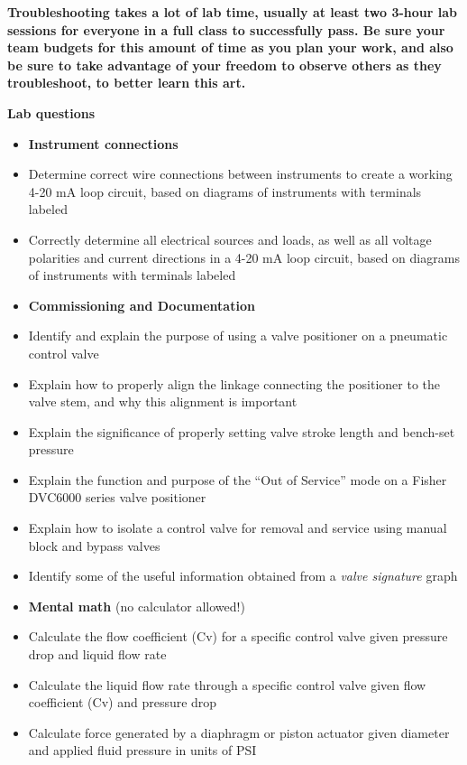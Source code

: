 \begin{itemize}
\vskip 10pt

{\bf Troubleshooting takes a lot of lab time, usually at least two 3-hour lab sessions for everyone in a full class to successfully pass.  Be sure your team budgets for this amount of time as you plan your work, and also be sure to take advantage of your freedom to observe others as they troubleshoot, to better learn this art.}



\vfil \eject

\noindent
{\bf Lab questions}

\vskip 5pt

\begin{itemize}
\item{} {\bf Instrument connections}
\item{} Determine correct wire connections between instruments to create a working 4-20 mA loop circuit, based on diagrams of instruments with terminals labeled
\item{} Correctly determine all electrical sources and loads, as well as all voltage polarities and current directions in a 4-20 mA loop circuit, based on diagrams of instruments with terminals labeled
\end{itemize}

\filbreak

\begin{itemize}
\item{} {\bf Commissioning and Documentation}
\item{} Identify and explain the purpose of using a valve positioner on a pneumatic control valve
\item{} Explain how to properly align the linkage connecting the positioner to the valve stem, and why this alignment is important
\item{} Explain the significance of properly setting valve stroke length and bench-set pressure
\item{} Explain the function and purpose of the ``Out of Service'' mode on a Fisher DVC6000 series valve positioner
\item{} Explain how to isolate a control valve for removal and service using manual block and bypass valves
\item{} Identify some of the useful information obtained from a {\it valve signature} graph
\end{itemize}

\filbreak

\begin{itemize}
\item{} {\bf Mental math} (no calculator allowed!)
\item{} Calculate the flow coefficient (Cv) for a specific control valve given pressure drop and liquid flow rate
\item{} Calculate the liquid flow rate through a specific control valve given flow coefficient (Cv) and pressure drop
\item{} Calculate force generated by a diaphragm or piston actuator given diameter and applied fluid pressure in units of PSI
\end{itemize}


\end{itemize}
